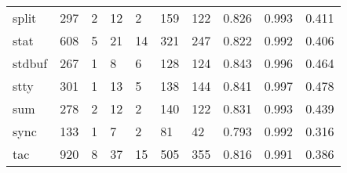 \begin{longtable}{lp{1.3cm}p{1.3cm}p{1.3cm}p{1.3cm}p{1.3cm}p{1.3cm}p{1.3cm}p{1.3cm}p{1.3cm}}
split     &                    297 &                                  2 &                                12 &                                2 &                               159 &                             122 &                                   0.826 &                                  0.993 &                                0.411 \\
stat      &                    608 &                                  5 &                                21 &                               14 &                               321 &                             247 &                                   0.822 &                                  0.992 &                                0.406 \\
stdbuf    &                    267 &                                  1 &                                 8 &                                6 &                               128 &                             124 &                                   0.843 &                                  0.996 &                                0.464 \\
stty      &                    301 &                                  1 &                                13 &                                5 &                               138 &                             144 &                                   0.841 &                                  0.997 &                                0.478 \\
sum       &                    278 &                                  2 &                                12 &                                2 &                               140 &                             122 &                                   0.831 &                                  0.993 &                                0.439 \\
sync      &                    133 &                                  1 &                                 7 &                                2 &                                81 &                              42 &                                   0.793 &                                  0.992 &                                0.316 \\
tac       &                    920 &                                  8 &                                37 &                               15 &                               505 &                             355 &                                   0.816 &                                  0.991 &                                0.386 \\

\end{longtable}
